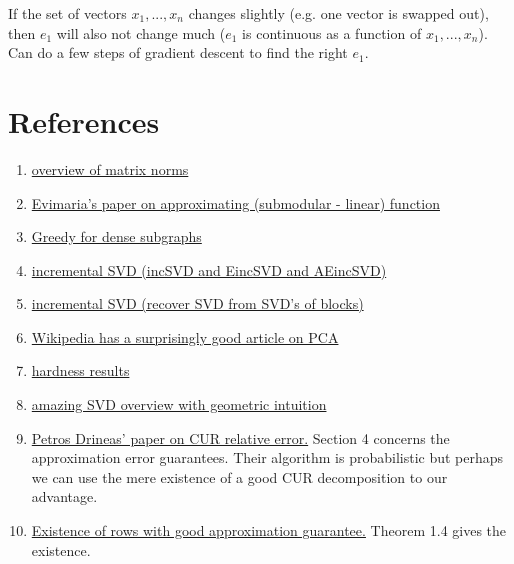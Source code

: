 \documentclass{article}
\begin{document}
If the set of vectors $x_1,...,x_n$ changes slightly (e.g. one vector is swapped out), then $e_1$ will also not change much ($e_1$ is continuous as a function of $x_1,...,x_n$). Can do a few steps of gradient descent to find the right $e_1$.

\section{References}
\begin{enumerate}
    \item \href{https://www.cis.upenn.edu/~cis515/cis515-11-sl4.pdf}{overview of matrix norms} 
    \item \href{https://arxiv.org/pdf/2002.07782.pdf}{Evimaria's paper on approximating (submodular - linear) function} 
    \item \href{https://users.ics.aalto.fi/gionis/greedy-dense.pdf}{Greedy for dense subgraphs}  
    \item \href{https://ieeexplore.ieee.org/stamp/stamp.jsp?tp=&arnumber=8548605}{incremental SVD (incSVD and EincSVD and AEincSVD)}
    \item \href{https://arxiv.org/pdf/1601.07010.pdf}{incremental SVD (recover SVD from SVD's of blocks)}
    \item \href{https://en.wikipedia.org/wiki/Principal_component_analysis#Iterative_computation}{Wikipedia has a surprisingly good article on PCA}
    \item \href{https://www.semanticscholar.org/paper/The-intractability-of-computing-the-minimum-of-a-Vardy/2e0b89803e126a41e872f1d68eeb3e8eb71698c5}{hardness results}
    \item \href{https://www.cs.cmu.edu/~venkatg/teaching/CStheory-infoage/book-chapter-4.pdf}{amazing SVD overview with geometric intuition}
    \item \href{https://www.cs.purdue.edu/homes/pdrineas/documents/publications/Drineas_SIMAX_08b.pdf}{Petros Drineas' paper on CUR relative error.} Section 4 concerns the approximation error guarantees. Their algorithm is probabilistic but perhaps we can use the mere existence of a good CUR decomposition to our advantage.
    \item \href{https://www.theoryofcomputing.org/articles/v002a012/v002a012.pdf}{Existence of rows with good approximation guarantee.} Theorem 1.4 gives the existence.
\end{enumerate}

\printbibliography
\end{document}
